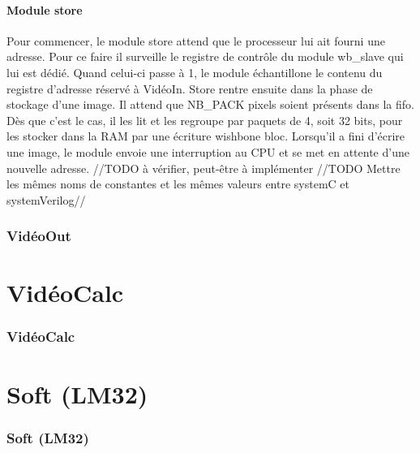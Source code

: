 \documentclass[a4paper,12pt]{report}
\begin{document}
\subsection*{Module store}
Pour commencer, le module store attend que le processeur lui ait fourni une adresse. Pour ce faire il surveille le registre de contrôle du module wb\_slave
qui lui est dédié. Quand celui-ci passe à 1, le module échantillone le contenu du registre d'adresse réservé à VidéoIn. 
Store rentre ensuite dans la phase de stockage d'une image.
Il attend que NB\_PACK pixels soient présents dans la fifo. Dès que c'est le cas, il les lit et les regroupe par paquets de 4, soit 32 bits,
pour les stocker dans la RAM par une écriture wishbone bloc. 
Lorsqu'il a fini d'écrire une image, le module envoie une interruption au CPU et se met en attente d'une nouvelle adresse.
//TODO à vérifier, peut-être à implémenter
//TODO Mettre les mêmes noms de constantes et les mêmes valeurs entre systemC et systemVerilog//


{}

\newpage
 
    \section*{VidéoOut}

{}
     








    \part{VidéoCalc} 
    \section*{VidéoCalc}

{}










    \part{Soft (LM32)} 

    \section*{Soft (LM32)}
\end{document}
